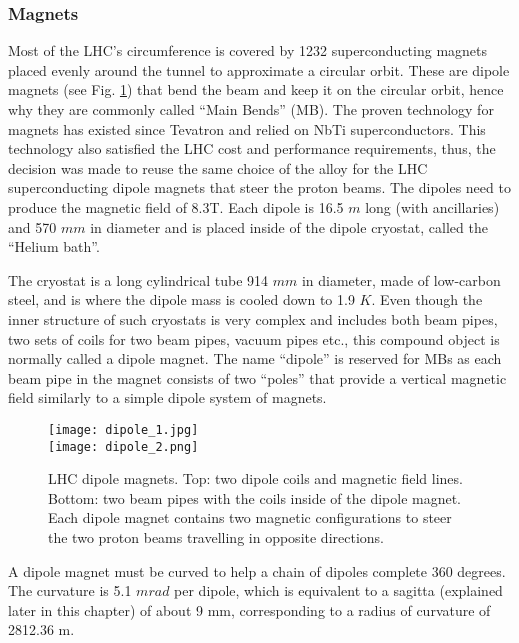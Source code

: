\begin{normalsize}

\subsubsection{Magnets}\label{sec:magnets}

Most of the LHC's circumference is covered by 1232 superconducting magnets placed evenly around the tunnel to approximate a circular orbit. These are dipole magnets (see Fig. \ref{dipoles_coils}) that bend the beam and keep it on the circular orbit, hence why they are commonly called ``Main Bends'' (MB). The proven technology for magnets has existed since Tevatron and relied on NbTi superconductors. This technology also satisfied the LHC cost and performance requirements, thus, the decision was made to reuse the same choice of the alloy for the LHC superconducting dipole magnets that steer the proton beams. The dipoles need to produce the magnetic field of 8.3T. %
Each dipole is 16.5 $m$ long (with ancillaries) and 570 $mm$ in diameter and is placed inside of the dipole cryostat, called the ``Helium bath''. 

The cryostat is a long cylindrical tube 914 $mm$ in diameter, made of low-carbon steel, and is where the dipole mass is cooled down to 1.9 $K$. Even though the inner structure of such cryostats is very complex and includes both beam pipes, two sets of coils for two beam pipes, vacuum pipes etc., this compound object is normally called a dipole magnet. The name ``dipole'' is reserved for MBs as each beam pipe in the magnet consists of two ``poles'' that provide a vertical magnetic field similarly to a simple dipole system of magnets. 


\begin{figure}[H]
\centering
\texttt{[image: dipole\_1.jpg]}\\
\vspace{0.5cm}
\texttt{[image: dipole\_2.png]}
\caption[LHC dipoles]{LHC dipole magnets. Top: two dipole coils and magnetic field lines. Bottom: two beam pipes with the coils inside of the dipole magnet. Each dipole magnet contains two magnetic configurations to steer the two proton beams travelling in opposite directions. }
\label{dipoles_coils}
\end{figure}



A  dipole magnet  must  be  curved to help a chain of dipoles complete 360 degrees. The curvature is 5.1 $mrad$ per dipole, which is equivalent to a  sagitta (explained later in this chapter) of  about  9 mm, corresponding to a radius of curvature of 2812.36 m.



\end{normalsize}
